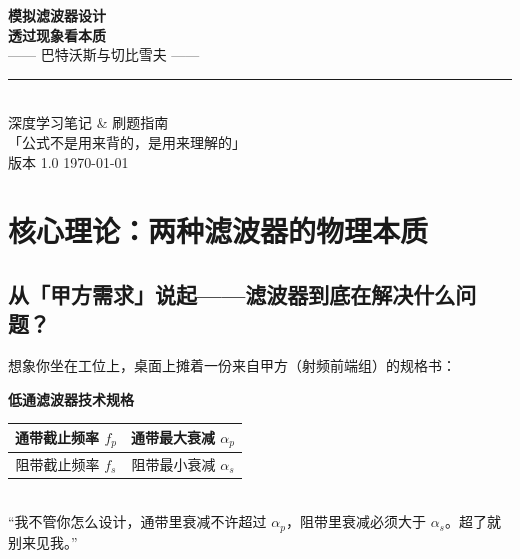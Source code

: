 \documentclass[12pt,a4paper]{ctexart}
\begin{document}
\begin{center}
    {\Huge\bfseries 模拟滤波器设计\\[6pt]}
    {\huge\bfseries 透过现象看本质\\[8pt]}
    {\Large —— 巴特沃斯与切比雪夫 ——\\[15pt]}
    \rule{0.7\textwidth}{1.5pt}\\[10pt]
    {\large\kaishu
    深度学习笔记 \& 刷题指南\\[5pt]
    「公式不是用来背的，是用来理解的」\\[20pt]
    \normalsize\songti 版本 1.0 \quad \textbullet\quad \today
    }
\end{center}

\thispagestyle{empty}
\newpage

\setcounter{page}{1}
\tableofcontents
\newpage

\section{核心理论：两种滤波器的物理本质}

\subsection{从「甲方需求」说起——滤波器到底在解决什么问题？}

想象你坐在工位上，桌面上摊着一份来自甲方（射频前端组）的规格书：

\begin{center}
\begin{tcolorbox}[width=0.85\textwidth, enhanced, colback=white, colframe=black!50,
    sharp corners, halign=center]
    \textbf{低通滤波器技术规格}\\[6pt]
    \begin{tabular}{c|c}
        \toprule
        通带截止频率 $f_p$ & 通带最大衰减 $\alpha_p$ \\
        \midrule
        阻带截止频率 $f_s$ & 阻带最小衰减 $\alpha_s$ \\
        \bottomrule
    \end{tabular}\\[6pt]
    \small\kaishu “我不管你怎么设计，通带里衰减不许超过 $\alpha_p$，阻带里衰减必须大于 $\alpha_s$。超了就别来见我。”
\end{tcolorbox}
\end{center}
\end{document}
